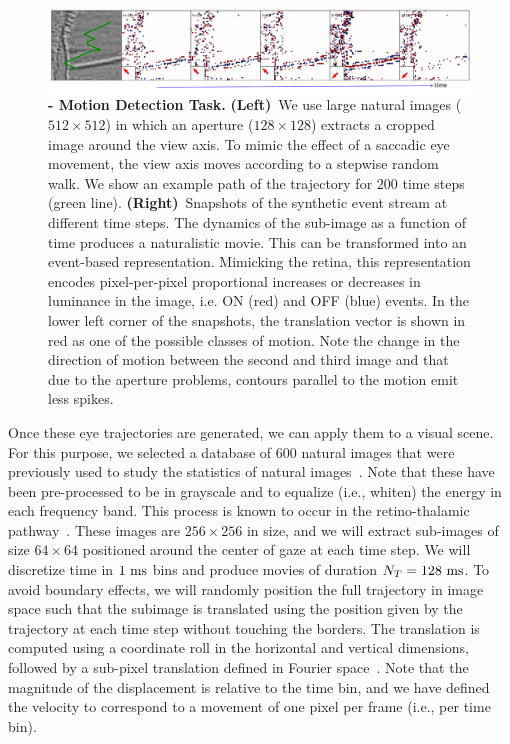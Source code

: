 \documentclass[default]{sn-jnl}%
\theoremstyle{thmstyleone}%
\theoremstyle{thmstyletwo}%
\theoremstyle{thmstylethree}%
\begin{document}
\begin{figure}%
    \centering
    \includegraphics[width=0.95\linewidth]{figures/motion_task.pdf}
    \caption{
        {\bf - Motion Detection Task.} {\bf (Left)}~We use large natural images ($512\times512$) in which an aperture ($128\times128$) extracts a cropped image around the view axis. To mimic the effect of a saccadic eye movement, the view axis moves according to a stepwise random walk. We show an example path of the trajectory for $200$ time steps (green line). {\bf (Right)}~Snapshots of the synthetic event stream at different time steps. The dynamics of the sub-image as a function of time produces a naturalistic movie. This can be transformed into an event-based representation. Mimicking the retina, this representation encodes pixel-per-pixel proportional increases or decreases in luminance in the image, i.e. ON (red) and OFF (blue) events. In the lower left corner of the snapshots, the translation vector is shown in red as one of the possible classes of motion. Note the change in the direction of motion between the second and third image and that due to the aperture problems, contours parallel to the motion emit less spikes.}
    \label{fig:motion_task}
\end{figure}
Once these eye trajectories are generated, we can apply them to a visual scene. %
For this purpose, we selected a database of 600 natural images that were previously used to study the statistics of natural images~\citep{perrinet_edge_2015}. Note that these have been pre-processed to be in grayscale and to equalize (i.e., whiten) the energy in each frequency band. This process is known to occur in the retino-thalamic pathway~\citep{dan_efficient_1996}. These images are $256 \times 256$ in size, and we will extract sub-images of size $64 \times 64$ positioned around the center of gaze at each time step. We will discretize time in $1~\si{\milli\second}$ bins and produce movies of duration $N_T = 128~\si{\milli\second}$. To avoid boundary effects, we will randomly position the full trajectory in image space such that the subimage is translated using the position given by the trajectory at each time step without touching the borders. The translation is computed using a coordinate roll in the horizontal and vertical dimensions, followed by a sub-pixel translation defined in Fourier space~\citep{perrinet_sparse_2015}. Note that the magnitude of the displacement is relative to the time bin, and we have defined the velocity to correspond to a movement of one pixel per frame (i.e., per time bin).
\end{document}
